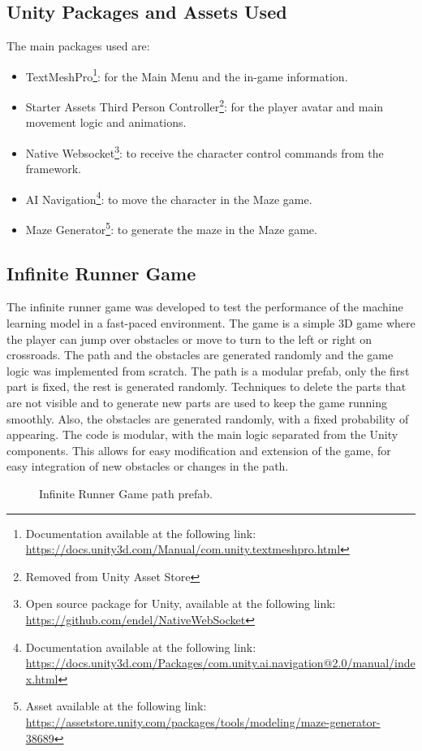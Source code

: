 \subsection*{Unity Packages and Assets Used}
The main packages used are:
\begin{itemize}
    \item TextMeshPro\footnote{Documentation available at the following link: \url{https://docs.unity3d.com/Manual/com.unity.textmeshpro.html}}: for the Main Menu and the in-game information.
    \item Starter Assets \textemdash Third Person Controller\footnote{Removed from Unity Asset Store}: for the player avatar and main movement logic and animations.
    \item Native Websocket\footnote{Open source package for Unity, available at the following link: \url{https://github.com/endel/NativeWebSocket}}: to receive the character control commands from the framework.
    \item AI Navigation\footnote{Documentation available at the following link: \url{https://docs.unity3d.com/Packages/com.unity.ai.navigation@2.0/manual/index.html}}: to move the character in the Maze game.
    \item Maze Generator\footnote{Asset available at the following link: \url{https://assetstore.unity.com/packages/tools/modeling/maze-generator-38689}}: to generate the maze in the Maze game.
\end{itemize}
\subsection*{Infinite Runner Game}
The infinite runner game was developed to test the performance of the machine learning model in a fast-paced environment.
The game is a simple 3D game where the player can jump over obstacles or move to turn to the left or right on crossroads.
The path and the obstacles are generated randomly and the game logic was implemented from scratch.
The path is a modular prefab, only the first part is fixed, the rest is generated randomly.
Techniques to delete the parts that are not visible and to generate new parts are used to keep the game running smoothly.
Also, the obstacles are generated randomly, with a fixed probability of appearing.
The code is modular, with the main logic separated from the Unity components.
This allows for easy modification and extension of the game, for easy integration of new obstacles or changes in the path.
\begin{figure}[!htbp]
    \centering
    \caption{Infinite Runner Game path prefab.}
    \label{fig:infinite_runner_path}
\end{figure}

